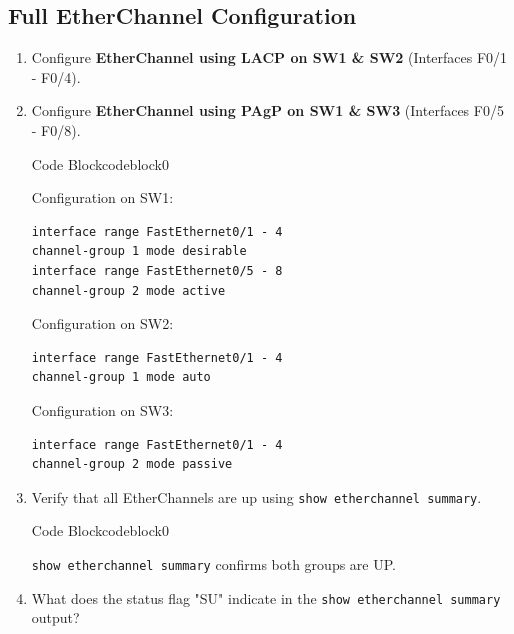 \documentclass[a4paper]{article}
\begin{document}
\subsection{Full EtherChannel Configuration}
\begin{enumerate}
	\item Configure \textbf{EtherChannel using LACP on SW1 \& SW2} (Interfaces F0/1 - F0/4).
	\item Configure \textbf{EtherChannel using PAgP on SW1 \& SW3} (Interfaces F0/5 - F0/8).


	      \begin{ocg}{Code Block}{codeblock}{0}

		      \vspace{0.5cm}
		      Configuration on SW1:
		      \begin{lstlisting}
interface range FastEthernet0/1 - 4
channel-group 1 mode desirable
interface range FastEthernet0/5 - 8
channel-group 2 mode active
    \end{lstlisting}
		      Configuration on SW2:
		      \begin{lstlisting}
interface range FastEthernet0/1 - 4
channel-group 1 mode auto
    \end{lstlisting}
		      Configuration on SW3:
		      \begin{lstlisting}
interface range FastEthernet0/1 - 4
channel-group 2 mode passive
    \end{lstlisting}
		      \vspace{0.5cm}
	      \end{ocg}

	\item Verify that all EtherChannels are up using \texttt{show etherchannel summary}.
	

	      \begin{ocg}{Code Block}{codeblock}{0}

		      \vspace{0.5cm}
		      \begin{tcolorbox}
			      \texttt{show etherchannel summary} confirms both groups are UP.
		      \end{tcolorbox}
		      \vspace{0.5cm}
	      \end{ocg}
	\item What does the status flag "SU" indicate in the \texttt{show etherchannel summary} output?


\end{enumerate}
\end{document}
